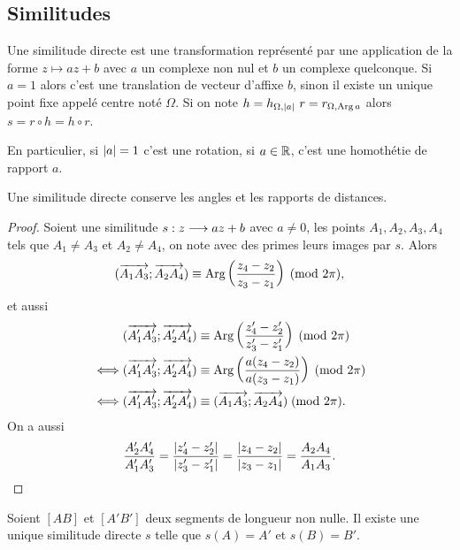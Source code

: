 \subsection{Similitudes}

Une similitude directe est une transformation représenté par une application de la forme \(z \longmapsto az+b\) avec \(a\) un complexe non nul et \(b\) un complexe quelconque. Si \(a=1\) alors c'est une translation de vecteur d'affixe \(b\), sinon il existe un unique point fixe appelé centre noté \(\Omega\). Si on note \(h=h_{\Omega, \abs{a}} \ r=r_{\Omega, \Arg{a}}\) alors \(s=r \circ h=h \circ r\).

En particulier, si \(\left\lvert a\right\rvert=1\) c'est une rotation, si \(a \in \mathbb{R}\), c'est une homothétie de rapport \(a\).

\begin{prop}
  Une similitude directe conserve les angles et les rapports de distances.
\end{prop}
\begin{proof}
  Soient une similitude \(s:z \longrightarrow az+b\) avec \(a \neq 0\), les points \(A_1,A_2,A_3,A_4\) tels que \(A_1 \neq A_3\) et \(A_2 \neq A_4\), on note avec des primes leurs images par \(s\). Alors
  \begin{equation}
    (\overrightarrow{A_1 A_3};\overrightarrow{A_2 A_4}) \equiv \operatorname{Arg}\left(\frac{z_4-z_2}{z_3-z_1}\right)\!\pmod {2\pi},
  \end{equation}
et aussi
\begin{align}
    &(\overrightarrow{A'_1 A'_3};\overrightarrow{A'_2 A'_4}) \equiv \operatorname{Arg}\left(\frac{z'_4-z'_2}{z'_3-z'_1}\right)\!\pmod {2\pi}\\
    \iff&(\overrightarrow{A'_1 A'_3};\overrightarrow{A'_2 A'_4}) \equiv \operatorname{Arg}\left(\frac{a(z_4-z_2)}{a(z_3-z_1)}\right)\!\pmod {2\pi}\\
    \iff&(\overrightarrow{A'_1 A'_3};\overrightarrow{A'_2 A'_4}) \equiv (\overrightarrow{A_1 A_3};\overrightarrow{A_2 A_4})\!\pmod {2\pi}.
  \end{align}
  On a aussi
\begin{equation}
  \frac{A'_2A'_4}{A'_1A'_3}=\frac{\left\lvert z'_4-z'_2\right\rvert}{\left\lvert z'_3-z'_1\right\rvert}=\frac{\left\lvert z_4-z_2\right\rvert}{\left\lvert z_3-z_1\right\rvert}=\frac{A_2A_4}{A_1A_3}.
\end{equation}
\end{proof}

\begin{prop}
  Soient \([AB]\) et \([A'B']\) deux segments de longueur non nulle. Il existe une unique similitude directe \(s\) telle que \(s(A)=A'\) et \(s(B)=B'\).
\end{prop}
\cleardoublepage
